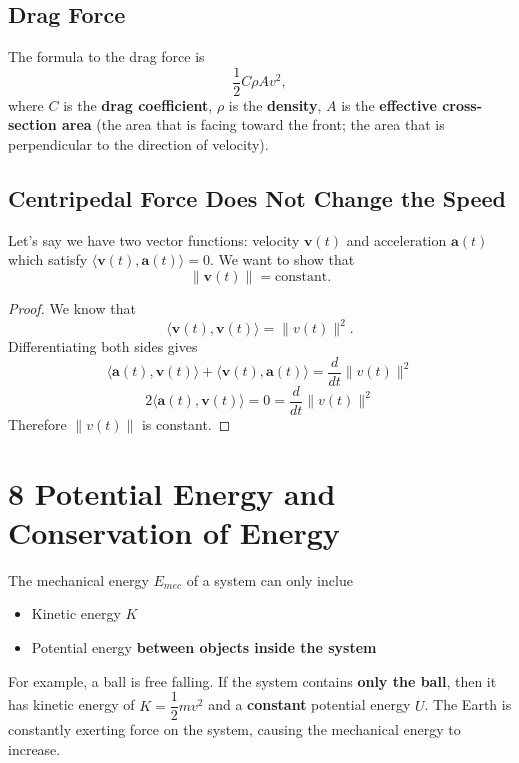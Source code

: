 \documentclass[12pt,a4paper]{report}
\begin{document}
  \subsection*{Drag Force}
  The formula to the drag force is
  \[\frac 1 2 C \rho A v^2,\]
  where \(C\) is the \textbf{drag coefficient}, \(\rho\) is the \textbf{density}, \(A\) is the \textbf{effective cross-section area} (the area that is facing toward the front; the area that is perpendicular to the direction of velocity).

  \subsection*{Centripedal Force Does Not Change the Speed}
  Let's say we have two vector functions: velocity \(\mathbf v(t)\) and acceleration \(\mathbf a(t)\) which satisfy \(\langle \mathbf v(t), \mathbf a(t)\rangle = 0\). We want to show that
  \[\|\mathbf v(t)\| = \text{constant}.\]
  
  \begin{proof}
    We know that
    \[\langle \mathbf v(t), \mathbf v(t)\rangle = \|v(t)\|^2.\]
    Differentiating both sides gives
    \[\langle \mathbf a(t), \mathbf v(t)\rangle + \langle \mathbf v(t), \mathbf a(t)\rangle = \frac{d}{dt}\|v(t)\|^2\]
    \[2\langle \mathbf a(t), \mathbf v(t)\rangle = 0 = \frac{d}{dt}\|v(t)\|^2\]
    Therefore \(\|v(t)\|\) is constant. 
  \end{proof}

  \section*{8 Potential Energy and Conservation of Energy}
  The mechanical energy \(E_{mec}\) of a system can only inclue 
  \begin{itemize}
    \item Kinetic energy \(K\)  
    \item Potential energy \textbf{between objects inside the system}
  \end{itemize}
  
  For example, a ball is free falling. If the system contains \textbf{only the ball}, then it has kinetic energy of \(K = \dfrac 1 2 mv^2\) and a \textbf{constant} potential energy \(U\). The Earth is constantly exerting force on the system, causing the mechanical energy to increase.  
\end{document}
